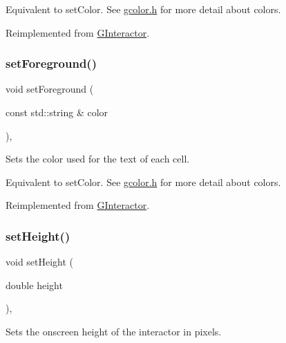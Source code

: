 Equivalent to set\+Color. See \mbox{\hyperlink{gcolor_8h_source}{gcolor.\+h}} for more detail about colors. 

Reimplemented from \mbox{\hyperlink{classGInteractor_a9eb856b5ff83a19df3831a31f15f4563}{G\+Interactor}}.

\mbox{\label{classGTable_a8afbcf1f47750fb4c717f9ff36540235}} 
\subsubsection{\texorpdfstring{set\+Foreground()}{setForeground()}\hspace{0.1cm}{\footnotesize\ttfamily [2/2]}}
{\footnotesize\ttfamily void set\+Foreground (\begin{DoxyParamCaption}\item[{const std\+::string \&}]{color }\end{DoxyParamCaption})\hspace{0.3cm}{\ttfamily [override]}, {\ttfamily [virtual]}}



Sets the color used for the text of each cell. 

Equivalent to set\+Color. See \mbox{\hyperlink{gcolor_8h_source}{gcolor.\+h}} for more detail about colors. 

Reimplemented from \mbox{\hyperlink{classGInteractor_af59209aeadea6dfc6d97a2d8531f50e1}{G\+Interactor}}.

\mbox{\label{classGInteractor_a9e280bfc4544dfaf8e4376c4e1a74357}} 
\subsubsection{\texorpdfstring{set\+Height()}{setHeight()}}
{\footnotesize\ttfamily void set\+Height (\begin{DoxyParamCaption}\item[{double}]{height }\end{DoxyParamCaption})\hspace{0.3cm}{\ttfamily [virtual]}, {\ttfamily [inherited]}}



Sets the onscreen height of the interactor in pixels. 


